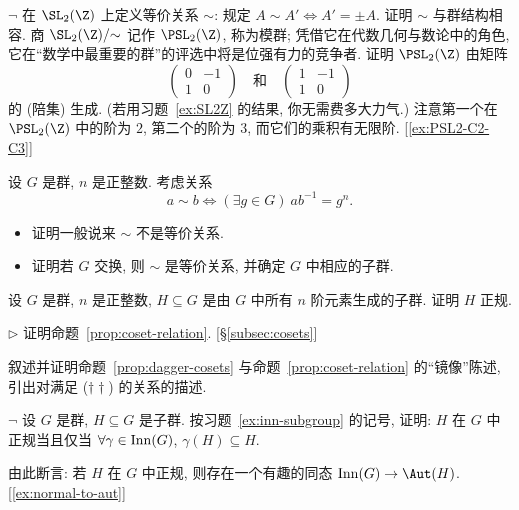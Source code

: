 \begin{prob}
\label{ex:PSL2Z}
$\neg$ 在 $\SL_2(\Z)$ 上定义等价关系 $\sim$: 规定 $A \sim A' \iff A' = \pm A$. 证明 $\sim$ 与群结构相容. 商 $\SL_2(\Z)/{\sim}$ 记作 $\PSL_2(\Z)$, 称为模群; 凭借它在代数几何与数论中的角色, 它在``数学中最重要的群''的评选中将是位强有力的竞争者. 证明 $\PSL_2(\Z)$ 由矩阵
\[
\begin{pmatrix} 0 & -1 \\ 1 & 0 \end{pmatrix} \quad \text{和} \quad \begin{pmatrix} 1 & -1 \\ 1 & 0 \end{pmatrix}
\]
的 (陪集) 生成. (若用习题~\ref{ex:SL2Z} 的结果, 你无需费多大力气.) 注意第一个在 $\PSL_2(\Z)$ 中的阶为 $2$, 第二个的阶为 $3$, 而它们的乘积有无限阶. [\ref{ex:PSL2-C2-C3}]
\end{prob}

\begin{prob}
\label{ex:power-relation}
设 $G$ 是群, $n$ 是正整数. 考虑关系
\[
a \sim b \iff (\exists g \in G)\ ab^{-1} = g^n.
\]
\begin{itemize}
	\item 证明一般说来 $\sim$ 不是等价关系.
	\item 证明若 $G$ 交换, 则 $\sim$ 是等价关系, 并确定 $G$ 中相应的子群.
\end{itemize}
\end{prob}

\begin{prob}
\label{ex:order-n-subgroup}
设 $G$ 是群, $n$ 是正整数, $H \subseteq G$ 是由 $G$ 中所有 $n$ 阶元素生成的子群. 证明 $H$ 正规.
\end{prob}

\begin{prob}
\label{ex:prop-7-6}
$\triangleright$ 证明命题~\ref{prop:coset-relation}. [\S\ref{subsec:cosets}]
\end{prob}

\begin{prob}
\label{ex:mirror-dagger}
叙述并证明命题~\ref{prop:dagger-cosets} 与命题~\ref{prop:coset-relation} 的``镜像''陈述, 引出对满足 ($\dagger\dagger$) 的关系的描述.
\end{prob}

\begin{prob}
\label{ex:normal-inn-invariant}
$\neg$ 设 $G$ 是群, $H \subseteq G$ 是子群. 按习题~\ref{ex:inn-subgroup} 的记号, 证明: $H$ 在 $G$ 中正规当且仅当 $\forall \gamma \in \operatorname{Inn}(G)$, $\gamma(H) \subseteq H$.

由此断言: 若 $H$ 在 $G$ 中正规, 则存在一个有趣的同态 $\Inn(G) \to \Aut(H)$. [\ref{ex:normal-to-aut}]
\end{prob}


